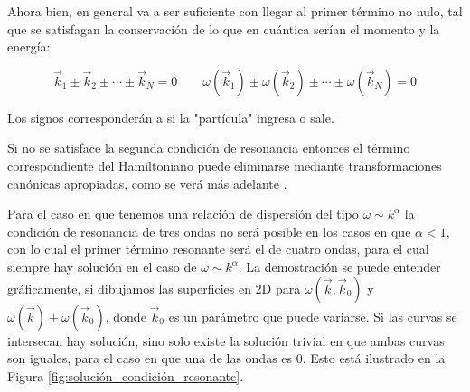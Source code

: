 Ahora bien, en general va a ser suficiente con llegar al primer término no nulo, tal que se satisfagan la conservación de lo que en cuántica serían el momento y la energía: 

\begin{equation}
	\vec k_1 \pm \vec k_2 \pm \cdots \pm \vec k_N = 0 \qquad \omega(\vec k_1) \pm \omega(\vec k_2) \pm \cdots \pm \omega(\vec k_N) = 0
	\label{eq:condición_resonancia}
\end{equation}

Los signos corresponderán a si la "partícula" ingresa o sale. 

Si no se satisface la segunda condición de resonancia entonces el término correspondiente del Hamiltoniano puede eliminarse mediante transformaciones canónicas apropiadas, como se verá más adelante \cite{zakharovKolmogorovSpectraTurbulence1992}.

Para el caso en que tenemos una relación de dispersión del tipo $\omega\sim k^{\alpha}$ la condición de resonancia de tres ondas no será posible en los casos en que $\alpha<1$, con lo cual el primer término resonante será el de cuatro ondas, para el cual siempre hay solución en el caso de $\omega\sim k^{\alpha}$. La demostración se puede entender gráficamente, si dibujamos las superficies en 2D para $\omega(\vec k, \vec k_0)$ y $\omega(\vec k) + \omega(\vec k_0)$, donde $\vec k_0$ es un parámetro que puede variarse. Si las curvas se intersecan hay solución, sino solo existe la solución trivial en que ambas curvas son iguales, para el caso en que una de las ondas es 0. Esto está ilustrado en la Figura \ref{fig:solución_condición_resonante}. %

